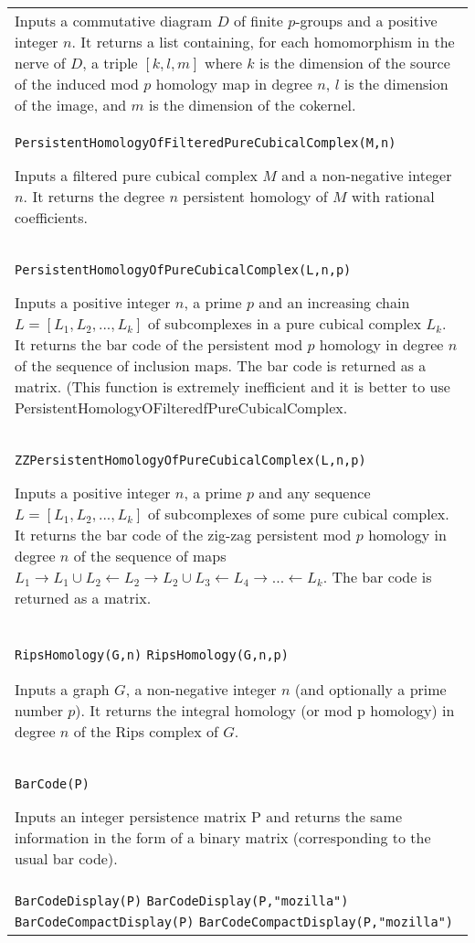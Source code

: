 \documentclass[a4paper,11pt]{report}
\begin{document}
{\begin{center}
\begin{tabular}{|l|}
 Inputs a commutative diagram $D$ of finite $p$-groups and a positive integer $n$. It returns a list containing, for each homomorphism in the nerve of $D$, a triple $[k,l,m]$ where $k$ is the dimension of the source of the induced mod $p$ homology map in degree $n$, $l$ is the dimension of the image, and $m$ is the dimension of the cokernel. \\
 \index{PersistentHomologyOfFilteredPureCubicalComplex} \texttt{PersistentHomologyOfFilteredPureCubicalComplex(M,n)} 

 Inputs a filtered pure cubical complex $M$ and a non-negative integer $n$. It returns the degree $n$ persistent homology of $ M$ with rational coefficients. \\
 \index{PersistentHomologyOfPureCubicalComplex} \texttt{PersistentHomologyOfPureCubicalComplex(L,n,p)} 

 Inputs a positive integer $n$, a prime $p$ and an increasing chain $L=[L_1, L_2, ..., L_k]$ of subcomplexes in a pure cubical complex $L_k$. It returns the bar code of the persistent mod $p$ homology in degree $n$ of the sequence of inclusion maps. The bar code is returned as a matrix. (This
function is extremely inefficient and it is better to use
PersistentHomologyOFilteredfPureCubicalComplex. 

 \\
 \index{ZZPersistentHomologyOfPureCubicalComplex} \texttt{ZZPersistentHomologyOfPureCubicalComplex(L,n,p)} 

 Inputs a positive integer $n$, a prime $p$ and any sequence $L=[L_1, L_2, ..., L_k]$ of subcomplexes of some pure cubical complex. It returns the bar code of the
zig-zag persistent mod $p$ homology in degree $n$ of the sequence of maps $L_1 \rightarrow L_1 \cup L_2 \leftarrow L_2 \rightarrow L_2 \cup L_3
\leftarrow L_4 \rightarrow ... \leftarrow L_k$. The bar code is returned as a matrix. 

 \\
 \index{RipsHomology} \texttt{RipsHomology(G,n)} \texttt{RipsHomology(G,n,p)} 

 Inputs a graph $G$, a non-negative integer $n$ (and optionally a prime number $p$). It returns the integral homology (or mod p homology) in degree $n$ of the Rips complex of $G$. \\
 \index{BarCode} \texttt{BarCode(P)} 

 Inputs an integer persistence matrix P and returns the same information in the
form of a binary matrix (corresponding to the usual bar code). \\
 \index{BarCodeDisplay} \index{BarCodeCompactDisplay} \texttt{BarCodeDisplay(P)} \texttt{BarCodeDisplay(P,"mozilla")} \texttt{BarCodeCompactDisplay(P)} \texttt{BarCodeCompactDisplay(P,"mozilla")} 


\end{tabular}
\end{center}}
\end{document}
